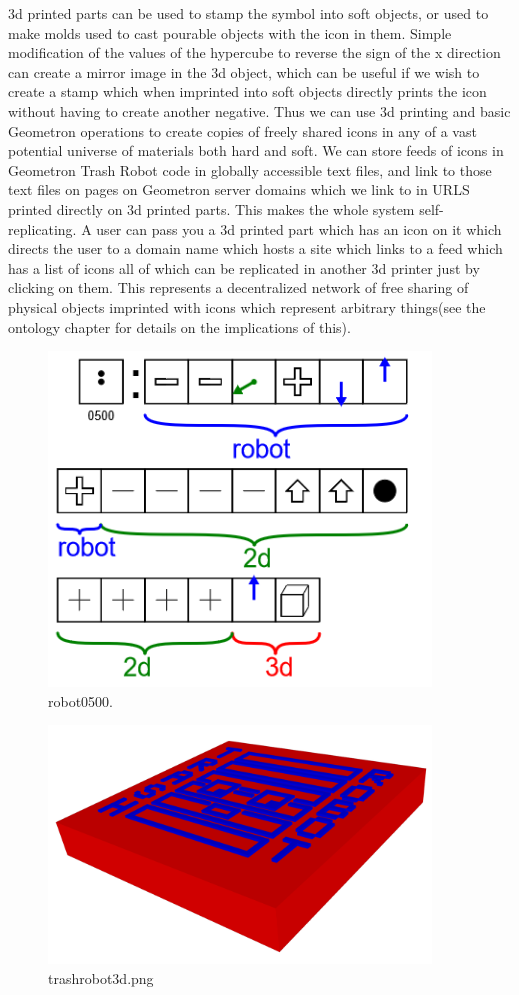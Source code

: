 3d printed parts can be used to stamp the symbol into soft objects, or used to make molds used to cast pourable objects with the icon in them.  Simple modification of the values of the hypercube to reverse the sign of the x direction can create a mirror image in the 3d object, which can be useful if we wish to create a stamp which when imprinted into soft objects directly prints the icon without having to create another negative.  Thus we can use 3d printing and basic Geometron operations to create copies of freely shared icons in any of a vast potential universe of materials both hard and soft.  We can store feeds of icons in Geometron Trash Robot code in globally accessible text files, and link to those text files on pages on Geometron server domains which we link to in URLS printed directly on 3d printed parts.  This makes the whole system self-replicating.  A user can pass you a 3d printed part which has an icon on it which directs the user to a domain name which hosts a site which links to a feed which has a list of icons all of which can be replicated in another 3d printer just by clicking on them.  This represents a decentralized network of free sharing of physical objects imprinted with icons which represent arbitrary things(see the ontology chapter for details on the implications of this).

\begin{figure}
	\centering
	\includegraphics[width=4in]{figures/geometron3d/robot0500.png}
	\caption[robot0500]
	{robot0500.}
\end{figure}

\begin{figure}
	\centering
	\includegraphics[width=4in]{figures/geometron3d/trashrobot3d.png}
	\caption[trashrobot3d]
	{trashrobot3d.png}
\end{figure}

